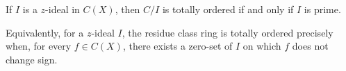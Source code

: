 If $I$ is a $z$-ideal in $C(X)$, then $C/I$ is totally ordered if and only if $I$ is prime.

Equivalently, for a $z$-ideal $I$, the residue class ring is totally ordered precisely when, for every $f \in C(X)$, there exists a zero-set of $I$ on which $f$ does not change sign.
